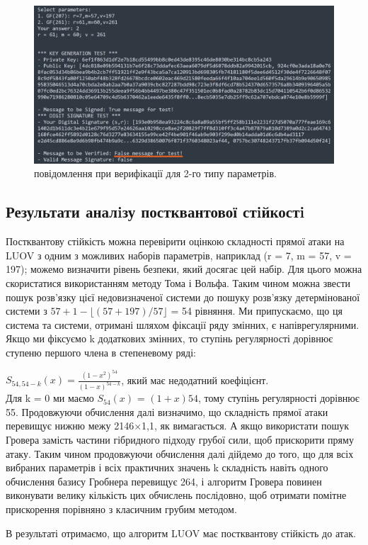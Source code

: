 \begin{figure}[ht!]
    \centering
    \includegraphics[scale = 0.6]{IMAGES/digit_sign_testF2.png}
    \caption{ повідомлення при верифікації для 2-го типу параметрів.}
    \label{fig1}
\end{figure}

\newpage
\subsection{Результати аналiзу постквантової стiйкостi}
\vspace{-0.5cm}
Постквантову стійкість можна перевірити оцінкою складності прямої атаки на LUOV з одним з можливих наборів параметрів, наприклад (r = 7, m = 57, v = 197); можемо визначити рівень безпеки, який досягає цей набір. Для цього можна скористатися використанням методу Тома і Вольфа. Таким чином можна звести пошук розв'язку цієї недовизначеної системи до пошуку розв'язку детермінованої системи з $57+1-\lfloor(57+197)/57\rfloor$ = 54 рівняння. Ми припускаємо, що ця система та системи, отримані шляхом фіксації ряду змінних, є напіврегулярними. Якщо ми фіксуємо k додаткових змінних, то ступінь регулярності дорівнює ступеню першого члена в степеневому ряді:

$S_{54,54-k}(x) = \frac{(1-x^2)^{54}}{(1-x)^{54-k}}$, який має недодатний коефіцієнт.\\
Для k = 0 ми маємо $S_{54}(x)$ = $(1 + x)54$, тому ступінь регулярності дорівнює 55.
Продовжуючи обчислення далі визначимо, що складність прямої атаки перевищує нижню межу 2146×1,1, як вимагається.
А якщо використати пошук Гровера замість частини гібридного підходу грубої сили, щоб прискорити пряму атаку. Таким чином продовжуючи обчислення далі дійдемо до того, що для всіх вибраних параметрів і всіх практичних значень k складність навіть одного обчислення базису Гробнера перевищує 264, і алгоритм Гровера повинен виконувати велику кількість цих обчислень послідовно, щоб отримати помітне прискорення порівняно з класичним грубим методом. 

В результаті отримаємо, що алгоритм LUOV має постквантову стійкість до атак.
